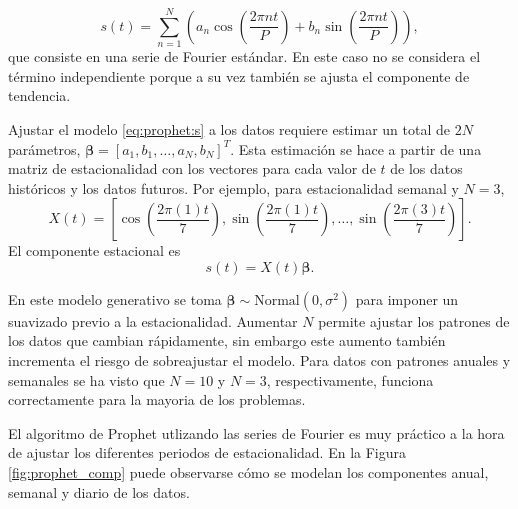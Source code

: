 \documentclass[12pt,twoside]{article}
\begin{document}
\begin{equation}\label{eq:prophet:s}
    s(t) = \sum_{n=1}^N \left( a_n\cos{\left(\frac{2\pi n t}{P}\right)} + b_n \sin{\left(\frac{2 \pi n t}{P}\right)}\right),
\end{equation}
que consiste en una serie de Fourier estándar. En este caso no se considera el término independiente porque a su vez también se ajusta el componente de tendencia.




Ajustar el modelo \eqref{eq:prophet:s} a los datos requiere estimar un total de $2N$ parámetros, $\boldsymbol{\beta} = [a_1, b_1, \dotsc, a_N, b_N]^T$. Esta estimación se hace a partir de una matriz de estacionalidad con los vectores para cada valor de $t$ de los datos históricos y los datos futuros. Por ejemplo, para estacionalidad semanal y $N=3$, 
\begin{equation*}
    X(t) = \left[ \cos{\left(\frac{2\pi (1)t}{7}\right)} , \sin{\left( \frac{2\pi(1)t}{7}\right)},  \dotsc, \sin{\left( \frac{2\pi(3)t}{7}\right)}  \right].
\end{equation*}
El componente estacional es
\begin{equation}\label{eq:prophet:s2}
    s(t) = X(t) \boldsymbol{\beta}.
\end{equation}

En este modelo generativo se toma $\boldsymbol{\beta} \sim \text{Normal}(0, \sigma^2)$ para imponer un suavizado previo a la estacionalidad. Aumentar $N$ permite ajustar los patrones de los datos que cambian rápidamente, sin embargo este aumento también incrementa el riesgo de sobreajustar el modelo. Para datos con patrones anuales y semanales se ha visto que $N=10$ y $N=3$, respectivamente, funciona correctamente para la mayoria de los problemas.

El algoritmo de Prophet utlizando las series de Fourier es muy práctico a la hora de ajustar los diferentes periodos de estacionalidad. En la Figura \ref{fig:prophet_comp} puede observarse cómo se modelan los componentes anual, semanal y diario de los datos.
\end{document}
